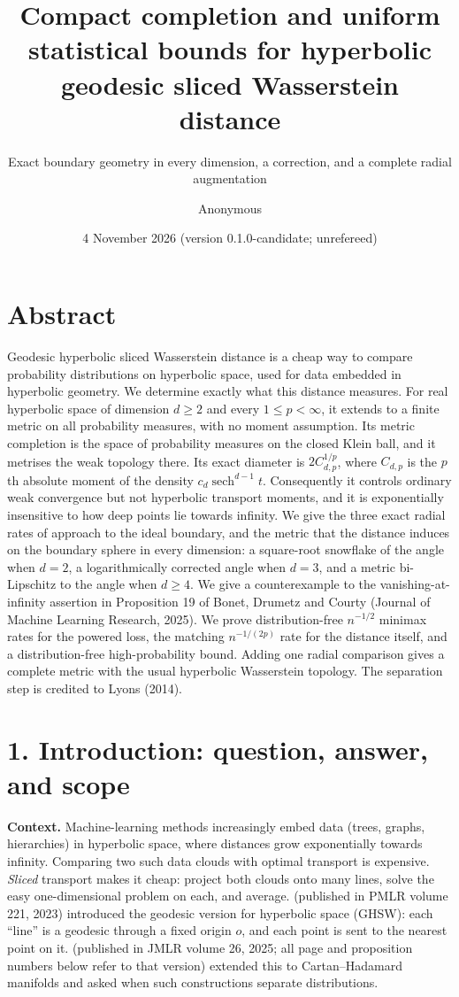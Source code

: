 \documentclass[
  british,
  11pt,
  a4paper,
]{article}
\title{Compact completion and uniform statistical bounds for hyperbolic
geodesic sliced Wasserstein distance}
\subtitle{Exact boundary geometry in every dimension, a correction, and
a complete radial augmentation}
\author{Anonymous}
\date{4 November 2026 (version 0.1.0-candidate; unrefereed)}
\begin{document}
\maketitle

{
\setcounter{tocdepth}{2}
\tableofcontents
}
\clearpage

\section{Abstract}\label{abstract}

Geodesic hyperbolic sliced Wasserstein distance is a cheap way to
compare probability distributions on hyperbolic space, used for data
embedded in hyperbolic geometry. We determine exactly what this distance
measures. For real hyperbolic space of dimension \(d\geq2\) and every
\(1\leq p<\infty\), it extends to a finite metric on all probability
measures, with no moment assumption. Its metric completion is the space
of probability measures on the closed Klein ball, and it metrises the
weak topology there. Its exact diameter is \(2C_{d,p}^{1/p}\), where
\(C_{d,p}\) is the \(p\)th absolute moment of the density
\(c_d\operatorname{sech}^{d-1}t\). Consequently it controls ordinary
weak convergence but not hyperbolic transport moments, and it is
exponentially insensitive to how deep points lie towards infinity. We
give the three exact radial rates of approach to the ideal boundary, and
the metric that the distance induces on the boundary sphere in every
dimension: a square-root snowflake of the angle when \(d=2\), a
logarithmically corrected angle when \(d=3\), and a metric bi-Lipschitz
to the angle when \(d\geq4\). We give a counterexample to the
vanishing-at-infinity assertion in Proposition 19 of Bonet, Drumetz and
Courty (Journal of Machine Learning Research, 2025). We prove
distribution-free \(n^{-1/2}\) minimax rates for the powered loss, the
matching \(n^{-1/(2p)}\) rate for the distance itself, and a
distribution-free high-probability bound. Adding one radial comparison
gives a complete metric with the usual hyperbolic Wasserstein topology.
The separation step is credited to Lyons (2014).

\section{1. Introduction: question, answer, and
scope}\label{introduction-question-answer-and-scope}

\textbf{Context.} Machine-learning methods increasingly embed data
(trees, graphs, hierarchies) in hyperbolic space, where distances grow
exponentially towards infinity. Comparing two such data clouds with
optimal transport is expensive. \emph{Sliced} transport makes it cheap:
project both clouds onto many lines, solve the easy one-dimensional
problem on each, and average. \citet{Bonet2023} (published in PMLR
volume 221, 2023) introduced the geodesic version for hyperbolic space
(GHSW): each ``line'' is a geodesic through a fixed origin \(o\), and
each point is sent to the nearest point on it. \citet{BDC2025}
(published in JMLR volume 26, 2025; all page and proposition numbers
below refer to that version) extended this to Cartan--Hadamard manifolds
and asked when such constructions separate distributions.
\end{document}
